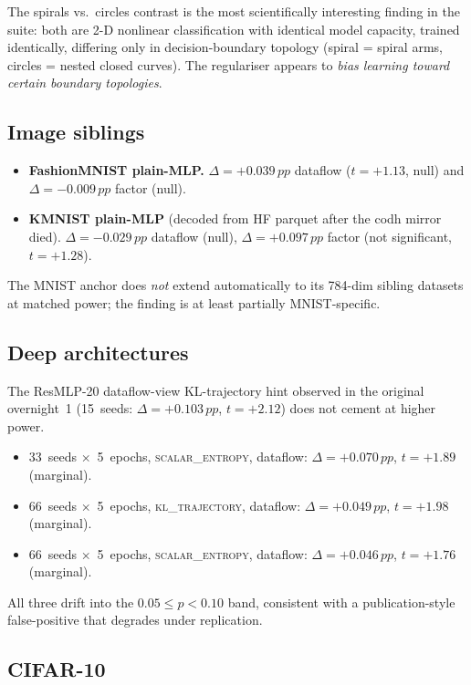 \documentclass[11pt,a4paper]{article}
\newcommand{\pp}{\,pp\xspace}
\newcommand{\scalarH}{\textsc{scalar\_entropy}\xspace}
\newcommand{\klT}{\textsc{kl\_trajectory}\xspace}
\begin{document}
The spirals vs.\ circles contrast is the most scientifically interesting
finding in the suite: both are 2-D nonlinear classification with
identical model capacity, trained identically, differing only in
decision-boundary topology (spiral = spiral arms, circles = nested
closed curves). The regulariser appears to \emph{bias learning toward
certain boundary topologies}.

\subsection{Image siblings}

\begin{itemize}
  \item \textbf{FashionMNIST plain-MLP.} $\Delta=+0.039\pp$ dataflow
    ($t=+1.13$, null) and $\Delta=-0.009\pp$ factor (null).
  \item \textbf{KMNIST plain-MLP} (decoded from HF parquet after the
    codh mirror died). $\Delta=-0.029\pp$ dataflow (null),
    $\Delta=+0.097\pp$ factor (not significant, $t=+1.28$).
\end{itemize}
The MNIST anchor does \emph{not} extend automatically to its
784-dim sibling datasets at matched power; the finding is at least
partially MNIST-specific.

\subsection{Deep architectures}

The ResMLP-20 dataflow-view KL-trajectory hint observed in the original
overnight~1 (15~seeds: $\Delta=+0.103\pp$, $t=+2.12$) does not cement at
higher power.
\begin{itemize}
  \item 33~seeds $\times$~5~epochs, \scalarH, dataflow: $\Delta=+0.070\pp$,
    $t=+1.89$ (marginal).
  \item 66~seeds $\times$~5~epochs, \klT, dataflow: $\Delta=+0.049\pp$,
    $t=+1.98$ (marginal).
  \item 66~seeds $\times$~5~epochs, \scalarH, dataflow: $\Delta=+0.046\pp$,
    $t=+1.76$ (marginal).
\end{itemize}
All three drift into the $0.05 \le p < 0.10$ band, consistent with a
publication-style false-positive that degrades under replication.

\subsection{CIFAR-10}
\end{document}
